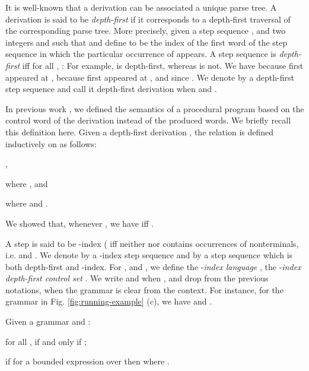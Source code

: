 \documentclass[final]{llncs}
\begin{document}
It is well-known that a derivation can be associated a unique parse
tree.  A derivation is said to be \emph{depth-first} if it corresponds
to a depth-first traversal of the corresponding parse tree.  More
precisely, given a step sequence , and two
integers  and
 such that  and  define
 to be the index  of the first word  of the step
sequence in which the particular occurrence of  appears.
A step sequence is \emph{depth-first} \cite{Luker80} if{}f for all , :
{\setlength\abovedisplayskip{4pt}
\setlength\belowdisplayskip{4pt}
}
For example,  is depth-first, whereas  is not. We
have  because  first appeared
at ,  because  first appeared
at ,  and  since . We denote by  a depth-first
step sequence and call it depth-first derivation when  and .


In previous work \cite{gik13}, we defined the semantics of a
procedural program based on the control word of the derivation instead of the produced words. We briefly
recall this definition here. Given a depth-first
derivation , the
relation 
is defined inductively on  as follows:
\begin{inparaenum}
\item ,
\item  where
       , and
\item  where 
      and .
\end{inparaenum}
We showed \cite[Lemma 2]{gik13}
that, whenever , we have  if{}f .


A step  is
said to be -index ( if{}f 
neither  nor  contains  occurrences of nonterminals, i.e.
 and .
We denote by 
a -index step sequence and by
 a step
sequence which is both depth-first and -index.
For ,  and , we
define the -\emph{index language} , the -\emph{index
depth-first control set} . We write 
and  when , and drop  from
the previous notations, when the grammar is clear from the
context. For instance, for the grammar in
Fig. \ref{fig:running-example} (c), we have  
and .
\smallskip

\begin{theorem}\label{thm:luker}
Given a grammar  and :
\begin{compactitem}
\item for all ,   if and only if
	;
\item if  for a bounded expression  over  then
	 where .
\end{compactitem}
\end{theorem}
\end{document}
